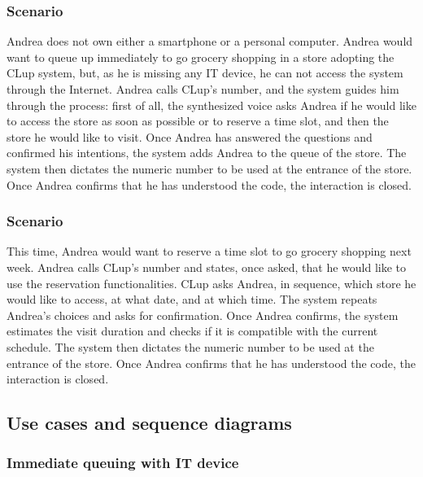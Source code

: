 \documentclass[../../main.tex]{subfiles}
\begin{document}
      \subsubsection{Scenario }

        Andrea does not own either a smartphone or a personal computer. 
        Andrea would want to queue up immediately to go grocery shopping in a store adopting the CLup system, 
        but, as he is missing any IT device, he can not access the system through the Internet. 
        Andrea calls CLup's number, and the system guides him through the process: first of all, 
        the synthesized voice asks Andrea if he would like to access the store as soon as possible or to reserve a time slot, 
        and then the store he would like to visit. Once Andrea has answered the questions and confirmed his intentions, 
        the system adds Andrea to the queue of the store. The system then dictates the numeric number to be used at the entrance of the store. 
        Once Andrea confirms that he has understood the code, the interaction is closed.



      \subsubsection{Scenario }

        This time, Andrea would want to reserve a time slot to go grocery shopping next week. 
        Andrea calls CLup's number and states, once asked, that he would like to use the reservation functionalities. 
        CLup asks Andrea, in sequence, which store he would like to access, at what date, and at which time. 
        The system repeats Andrea's choices and asks for confirmation. Once Andrea confirms, 
        the system estimates the visit duration and checks if it is compatible with the current schedule. 
        The system then dictates the numeric number to be used at the entrance of the store. 
        Once Andrea confirms that he has understood the code, the interaction is closed.


    \subsection{Use cases and sequence diagrams}

      \subsubsection{Immediate queuing with IT device}
\end{document}
